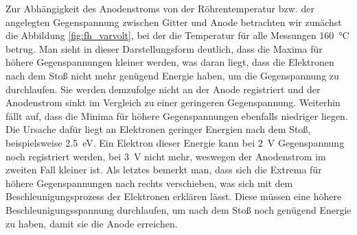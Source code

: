 \documentclass[11pt, a4paper]{article}
\begin{document}
Zur Abhängigkeit des Anodenstroms von der Röhrentemperatur bzw. der angelegten Gegenspannung zwischen Gitter und Anode betrachten wir zunächst die Abbildung \ref{fig:fh_varvolt}, bei der die Temperatur für alle Messungen \SI{160}{\degreeCelsius} betrug.
Man sieht in dieser Darstellungsform deutlich, dass die Maxima für höhere Gegenspannungen kleiner werden, was daran liegt, dass die Elektronen nach dem Stoß nicht mehr genügend Energie haben, um die Gegenspannung zu durchlaufen.
Sie werden demzufolge nicht an der Anode registriert und der Anodenstrom sinkt im Vergleich zu einer geringeren Gegenspannung.
Weiterhin fällt auf, dass die Minima für höhere Gegenspannungen ebenfalls niedriger liegen.
Die Ursache dafür liegt an Elektronen geringer Energien nach dem Stoß, beispielsweise \SI{2.5}{\electronvolt}.
Ein Elektron dieser Energie kann bei \SI{2}{\volt} Gegenspannung noch registriert werden, bei \SI{3}{\volt} nicht mehr, weswegen der Anodenstrom im zweiten Fall kleiner ist.
Als letztes bemerkt man, dass sich die Extrema für höhere Gegenspannungen nach rechts verschieben, was sich mit dem Beschleunigungsprozess der Elektronen erklären lässt.
Diese müssen eine höhere Beschleunigungsspannung durchlaufen, um nach dem Stoß noch genügend Energie zu haben, damit sie die Anode erreichen.
\end{document}
